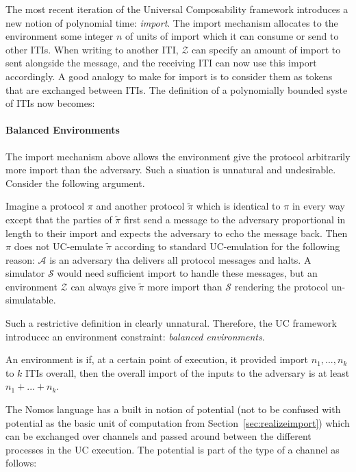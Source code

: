 The most recent iteration of the Universal Composability framework introduces a new notion of polynomial time: \textit{import}.
The import mechanism allocates to the environment some integer $n$ of units of import which it can consume or send to other ITIs.
When writing to another ITI, $\mathcal{Z}$ can specify an amount of import to sent alongside the message, and the receiving ITI can now use this import accordingly.
A good analogy to make for import is to consider them as tokens that are exchanged between ITIs. 
The definition of a polynomially bounded syste of ITIs now becomes: 


\paragraph{Balanced Environments}
The import mechanism above allows the environment give the protocol arbitrarily more import than the adversary.
Such a siuation is unnatural and undesirable. Consider the following argument.

Imagine a protocol $\pi$ and another protocol $\widetilde{\pi}$ which is identical to $\pi$ in every way except that the parties of $\widetilde{\pi}$ first send a message to the adversary proportional in length to their import and expects the adversary to echo the message back. 
Then $\pi$ does not UC-emulate $\widetilde{\pi}$ according to standard UC-emulation for the following reason: $\mathcal{A}$ is an adversary tha delivers all protocol messages and halts. A simulator $\mathcal{S}$ would need sufficient import to handle these messages, but an environment $\mathcal{Z}$ can always give $\widetilde{\pi}$ more import than $\mathcal{S}$ rendering the protocol un-simulatable. 

Such a restrictive definition in clearly unnatural. Therefore, the UC framework introducec an environment constraint: \textit{balanced environments}.

\begin{definition} \label{def:balancedenvironments}
An environment is  if, at a certain point of execution, it provided import $n_1,...,n_k$ to $k$ ITIs overall, then the overall import of the inputs to the adversary is at least $n_1 + ... + n_k$.
\end{definition}
 
The Nomos language has a built in notion of potential (not to be confused with potential as the basic unit of computation from Section~\ref{sec:realizeimport}) which can be exchanged over channels and passed around between the different processes in the UC execution.
The potential is part of the type of a channel as follows: 
